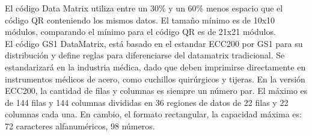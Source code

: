 El código Data Matrix utiliza entre un 30\% y un 60\% menos espacio que el código QR conteniendo los mismos datos. El tamaño mínimo es de 10x10 módulos, comparando el mínimo para el código QR es de 21x21 módulos. \cite{2006_Semacode_TECH_REPORT}
\\
El código GS1 DataMatrix, está basado en el estandar ECC200  por GS1 para su distribución y define reglas para diferenciarse del datamatrix tradicional. Se estandarizará en la industria médica, dado que deben imprimirse directamente en instrumentos médicos de acero, como cuchillos quirúrgicos y tijeras. En la versión ECC200, la cantidad de filas y columnas es siempre un número par. El máximo es de 144 filas y 144 columnas divididas en 36 regiones de datos de 22 filas y 22 columnas cada una. En cambio, el formato rectangular, la capacidad máxima es: 72 caracteres alfanuméricos, 98 números. \cite{GS12011}
